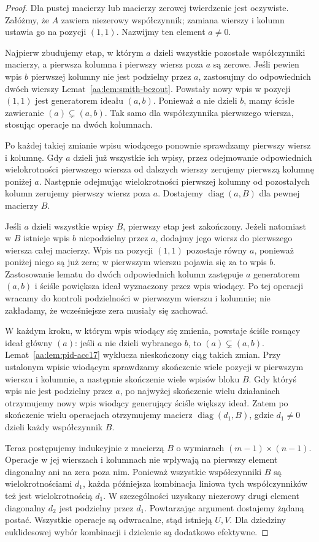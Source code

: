 \begin{proof}
Dla pustej macierzy lub macierzy zerowej twierdzenie jest
oczywiste. Załóżmy, że $A$ zawiera niezerowy współczynnik;
zamiana wierszy i kolumn ustawia go na pozycji $(1,1)$.
Nazwijmy ten element $a\ne0$.

Najpierw zbudujemy etap, w którym $a$ dzieli wszystkie
pozostałe współczynniki macierzy, a pierwsza kolumna i pierwszy
wiersz poza $a$ są zerowe. Jeśli pewien wpis $b$ pierwszej
kolumny nie jest podzielny przez $a$, zastosujmy do odpowiednich
dwóch wierszy Lemat~\ref{aa:lem:smith-bezout}. Powstały nowy
wpis w pozycji $(1,1)$ jest generatorem ideału $(a,b)$.
Ponieważ $a$ nie dzieli $b$, mamy ścisłe zawieranie
$(a)\subsetneq(a,b)$. Tak samo dla współczynnika pierwszego
wiersza, stosując operacje na dwóch kolumnach.

Po każdej takiej zmianie wpisu wiodącego ponownie sprawdzamy
pierwszy wiersz i kolumnę. Gdy $a$ dzieli już wszystkie ich
wpisy, przez odejmowanie
odpowiednich wielokrotności pierwszego wiersza od dalszych
wierszy zerujemy pierwszą kolumnę poniżej $a$. Następnie
odejmując wielokrotności pierwszej kolumny od pozostałych
kolumn zerujemy pierwszy wiersz poza $a$. Dostajemy
$\operatorname{diag}(a,B)$ dla pewnej macierzy $B$.

Jeśli $a$ dzieli wszystkie wpisy $B$, pierwszy etap jest zakończony.
Jeżeli natomiast w $B$ istnieje wpis $b$ niepodzielny przez $a$,
dodajmy jego wiersz do pierwszego wiersza całej macierzy.
Wpis na pozycji $(1,1)$ pozostaje równy $a$, ponieważ poniżej
niego są już zera; w pierwszym wierszu pojawia się za to
wpis $b$. Zastosowanie lematu do dwóch odpowiednich kolumn
zastępuje $a$ generatorem $(a,b)$ i ściśle powiększa ideał
wyznaczony przez wpis wiodący. Po tej operacji wracamy do
kontroli podzielności w pierwszym wierszu i kolumnie;
nie zakładamy, że wcześniejsze zera musiały się zachować.

W każdym kroku, w którym wpis wiodący się zmienia,
powstaje ściśle rosnący ideał główny $(a)$: jeśli
$a$ nie dzieli wybranego $b$, to $(a)\subsetneq(a,b)$.
Lemat~\ref{aa:lem:pid-acc17} wyklucza nieskończony
ciąg takich zmian. Przy ustalonym wpisie wiodącym
sprawdzamy skończenie wiele pozycji w pierwszym wierszu
i kolumnie, a następnie skończenie wiele wpisów bloku
$B$. Gdy któryś wpis nie jest podzielny przez $a$,
po najwyżej skończenie wielu działaniach otrzymujemy
nowy wpis wiodący generujący ściśle większy ideał.
Zatem po skończenie wielu operacjach otrzymujemy
macierz $\operatorname{diag}(d_1,B)$, gdzie $d_1\ne0$ dzieli
każdy współczynnik $B$.

Teraz postępujemy indukcyjnie z macierzą $B$ o wymiarach
$(m-1)\times(n-1)$. Operacje w jej wierszach i kolumnach
nie wpływają na pierwszy element diagonalny ani na zera poza
nim. Ponieważ wszystkie współczynniki $B$ są wielokrotnościami
$d_1$, każda późniejsza kombinacja liniowa tych współczynników
też jest wielokrotnością $d_1$. W szczególności uzyskany
niezerowy drugi element diagonalny $d_2$ jest podzielny przez
$d_1$. Powtarzając argument dostajemy żądaną postać.
Wszystkie operacje są odwracalne, stąd istnieją $U,V$.
Dla dziedziny euklidesowej wybór kombinacji i dzielenie
są dodatkowo efektywne.
\end{proof}

